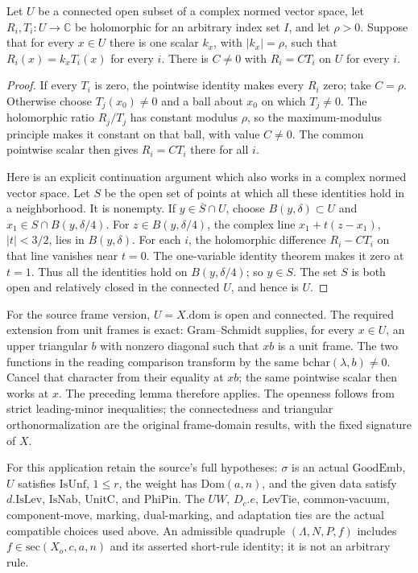 \begin{srlemma}\label{lem:sr-source-common-constant-norm-factor}
Let \(U\) be a connected open subset of a complex normed
vector space, let \(R_i,T_i:U\to\mathbb C\) be holomorphic
for an arbitrary index set \(I\), and let \(\rho>0\).
Suppose that for every \(x\in U\) there is one scalar
\(k_x\), with \(|k_x|=\rho\), such that
\(R_i(x)=k_xT_i(x)\) for every \(i\).
There is \(C\ne0\) with \(R_i=CT_i\) on \(U\) for
every \(i\).
\end{srlemma}
\begin{proof}
If every \(T_i\) is zero, the pointwise identity makes
every \(R_i\) zero; take \(C=\rho\).
Otherwise choose \(T_j(x_0)\ne0\) and a ball about
\(x_0\) on which \(T_j\ne0\).
The holomorphic ratio \(R_j/T_j\) has constant modulus
\(\rho\), so the maximum-modulus principle makes it
constant on that ball, with value \(C\ne0\).
The common pointwise scalar then gives
\(R_i=CT_i\) there for all \(i\).

Here is an explicit continuation argument which also
works in a complex normed vector space.
Let \(S\) be the open set of points at which all these
identities hold in a neighborhood.
It is nonempty.
If \(y\in\overline S\cap U\), choose
\(B(y,\delta)\subset U\) and
\(x_1\in S\cap B(y,\delta/4)\).
For \(z\in B(y,\delta/4)\), the complex line
\(x_1+t(z-x_1)\), \(|t|<3/2\), lies in
\(B(y,\delta)\).
For each \(i\), the holomorphic difference
\(R_i-CT_i\) on that line vanishes near \(t=0\).
The one-variable identity theorem makes it zero
at \(t=1\).
Thus all the identities hold on \(B(y,\delta/4)\);
so \(y\in S\).
The set \(S\) is both open and relatively closed in
the connected \(U\), and hence is \(U\).
\end{proof}

For the source frame version, \(U=X.\mathrm{dom}\)
is open and connected.
The required extension from unit frames is exact:
Gram--Schmidt supplies, for every \(x\in U\), an
upper triangular \(b\) with nonzero diagonal such
that \(xb\) is a unit frame.
The two functions in the reading comparison transform
by the same \(\mathrm{bchar}(\lambda,b)\ne0\).
Cancel that character from their equality at \(xb\);
the same pointwise scalar then works at \(x\).
The preceding lemma therefore applies.
The openness follows from strict leading-minor
inequalities; the connectedness and triangular
orthonormalization are the original frame-domain
results, with the fixed signature of \(X\).

For this application retain the source's full hypotheses:
\(\sigma\) is an actual \(\mathrm{GoodEmb}\), \(U\) satisfies
\(\mathrm{IsUnf}\), \(1\le r\), the weight has
\(\mathrm{Dom}(a,n)\), and the given data satisfy
\(d.\mathrm{IsLev}\), \(\mathrm{IsNab}\),
\(\mathrm{UnitC}\), and \(\mathrm{PhiPin}\).
The \(UW\), \(D_c.e\), \(\mathrm{LevTie}\), common-vacuum,
component-move, marking, dual-marking, and adaptation ties are
the actual compatible choices used above.
An admissible quadruple \((\Lambda,N,P,f)\) includes
\(f\in\mathrm{sec}(X_o,c,a,n)\) and its asserted
short-rule identity; it is not an arbitrary rule.

